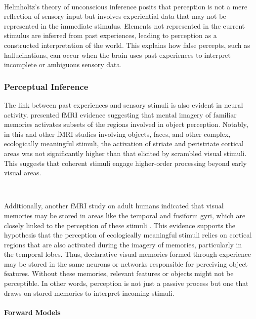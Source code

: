 \documentclass{article}
\begin{document}
\

Helmholtz’s theory of unconscious inference posits that perception is not a mere reflection of sensory input but involves experiential data that may not be represented in the immediate stimulus. \citep{helmholtz1867concerning} Elements not represented in the current stimulus are inferred from past experiences, leading to perception as a constructed interpretation of the world. This explains how false percepts, such as hallucinations, can occur when the brain uses past experiences to interpret incomplete or ambiguous sensory data.


\subsubsection{Perceptual Inference}

The link between past experiences and sensory stimuli is also evident in neural activity. \citet{ishai2000distributed} presented fMRI evidence suggesting that mental imagery of familiar memories activates subsets of the regions involved in object perception. Notably, in this and other fMRI studies involving objects, faces, and other complex, ecologically meaningful stimuli, the activation of striate and peristriate cortical areas was not significantly higher than that elicited by scrambled visual stimuli. This suggests that coherent stimuli engage higher-order processing beyond early visual areas.

\

Additionally, another fMRI study on adult humans indicated that visual memories may be stored in areas like the temporal and fusiform gyri, which are closely linked to the perception of these stimuli \citep{sterpenich2007sleep}. This evidence supports the hypothesis that the perception of ecologically meaningful stimuli relies on cortical regions that are also activated during the imagery of memories, particularly in the temporal lobes. Thus, declarative visual memories formed through experience may be stored in the same neurons or networks responsible for perceiving object features. Without these memories, relevant features or objects might not be perceptible. In other words, perception is not just a passive process but one that draws on stored memories to interpret incoming stimuli.

\paragraph{Forward Models}
\end{document}
